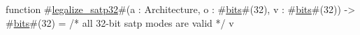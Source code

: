 function #\hyperref[sailRISCVzlegalizzezysatp32]{legalize\_satp32}#(a : Architecture, o : #\hyperref[sailRISCVzbits]{bits}#(32), v : #\hyperref[sailRISCVzbits]{bits}#(32)) -> #\hyperref[sailRISCVzbits]{bits}#(32) = {
  /* all 32-bit satp modes are valid */
  v
}
